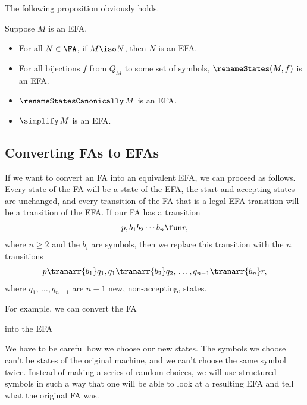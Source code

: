The following proposition obviously holds.

\begin{proposition}
Suppose $M$ is an EFA.
\begin{itemize}
\item For all $N\in\FA$, if $M\iso N$, then $N$ is an EFA.

\item For all bijections $f$ from $Q_M$ to some set of symbols,
  $\renameStates(M, f)$ is an EFA.

\item $\renameStatesCanonically\,M$ is an EFA.

\item $\simplify\,M$ is an EFA.
\end{itemize}
\end{proposition}

\subsection{Converting FAs to EFAs}

If we want to convert an FA into an equivalent EFA, we can proceed as
follows.  Every state of the FA will be a state of the EFA, the start
and accepting states are unchanged, and every transition of the FA
that is a legal EFA transition will be a transition
of the EFA.  If our FA has a transition
\begin{gather*}
p, b_1b_2\cdots b_n\fun r,
\end{gather*}
where $n\geq 2$ and the $b_i$ are symbols, then we replace this
transition with the $n$ transitions
\begin{gather*}
p\tranarr{b_1}q_1, q_1\tranarr{b_2}q_2,\,\ldots, q_{n-1}\tranarr{b_n}r,
\end{gather*}
where $q_1,\,\ldots,q_{n-1}$ are $n-1$ new, non-accepting, states.

For example, we can convert the FA
\begin{center}

\end{center}
into the EFA
\begin{center}

\end{center}

We have to be careful how we choose our new states.  The
symbols we choose can't be states of the original machine, and we
can't choose the same symbol twice.  Instead of making a series of
random choices, we will use structured symbols in such a way that
one will be able to look at a resulting EFA and tell what the
original FA was.

